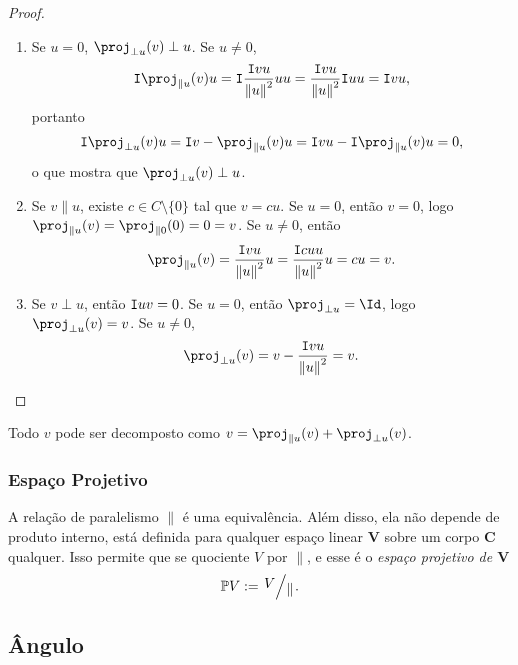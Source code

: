 \begin{proof}
\begin{enumerate}
\begin{enumerate}
		\item Se $u = 0$, $\proj_{\perp u}(v) \perp u$. Se $u \neq 0$,
	\begin{align*}
	\inte{\proj_{\parallel u}(v)}{u} = \inte{\frac{\inte{v}{u}}{\nor{u}^2}u}{u} = \frac{\inte{v}{u}}{\nor{u}^2}\inte{u}{u} = \inte{v}{u},
	\end{align*}
portanto
	\begin{align*}
	\inte{\proj_{\perp u}(v)}{u} = \inte{v - \proj_{\parallel u}(v)}{u} = \inte{v}{u} - \inte{\proj_{\parallel u}(v)}{u} = 0,
	\end{align*}
o que mostra que $\proj_{\perp u}(v) \perp u$.
		
		\item Se $v \parallel u$, existe $c \in C \setminus \{0\}$ tal que $v = cu$. Se $u = 0$, então $v=0$, logo $\proj_{\parallel u}(v) = \proj_{\parallel 0}(0) = 0 = v$. Se $u \neq 0$, então
		\begin{equation*}
		\proj_{\parallel u}(v) = \frac{\inte{v}{u}}{\nor{u}^2}u = \frac{\inte{cu}{u}}{\nor{u}^2}u = cu = v.
		\end{equation*}
		
		\item Se $v \perp u$, então $\mathtt I{u}{v}=0$. Se $u=0$, então $\proj_{\perp u} = \Id$, logo $\proj_{\perp u}(v) = v$. Se $u \neq 0$,
	\begin{equation*}
	\proj_{\perp u}(v) = v - \frac{\inte{v}{u}}{\nor{u}^2} = v.
	\end{equation*}
		\end{enumerate}
	\end{enumerate}
\end{proof}

Todo $v$ pode ser decomposto como $v = \proj_{\parallel u}(v) + \proj_{\perp u}(v)$.

\subsubsection{Espaço Projetivo}

A relação de paralelismo $\parallel$ é uma equivalência. Além disso, ela não depende de produto interno, está definida para qualquer espaço linear $\bm V$ sobre um corpo $\bm C$ qualquer. Isso permite que se quociente $V$ por $\parallel$, e esse é o \emph{espaço projetivo de $\bm V$}
	\begin{equation*}
	\pro V := \quo{V}{\parallel}.
	\end{equation*}

\subsection{Ângulo}

